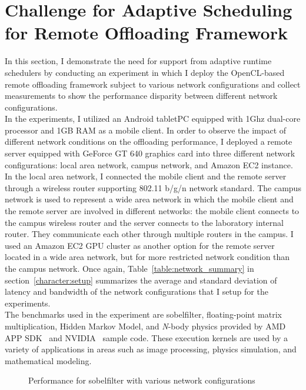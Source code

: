 \section{Challenge for Adaptive Scheduling for Remote Offloading
Framework}
\label{scheduler:challenge}
In this section, I demonstrate the need for support from adaptive
runtime schedulers by conducting an experiment in which I deploy the
OpenCL-based remote offloading framework subject to various network
configurations and collect measurements to show the performance
disparity between different network configurations.\\
%
In the experiments, I utilized an Android tabletPC equipped with
1Ghz dual-core processor and 1GB RAM as a mobile client.
%
In order to observe the impact of different network
conditions on the offloading performance, I deployed a remote server
equipped with GeForce GT 640 graphics card into three different network
configurations: local area network, campus network, and Amazon EC2
instance.
%
In the local area network, I connected the mobile client and the remote
server through a wireless router supporting 802.11 b/g/n network
standard.
%
The campus network is used to represent a wide area network in which
the mobile client and the remote server are involved in different
networks: the mobile client connects to the campus wireless router and
the server connects to the laboratory internal router.
%
They communicate each other through multiple routers in the campus.
%
I used an Amazon EC2 GPU cluster as another option for the remote
server located in a wide area network, but for more restricted network
condition than the campus network.
%
Once again, Table~\ref{table:network_summary} in
section~\ref{character:setup} summarizes the average and standard deviation of latency
and bandwidth of the network configurations that I setup for the
experiments.\\
%
The benchmarks used in the experiment are sobelfilter, floating-point
matrix multiplication, Hidden Markov Model, and \textit{N}-body physics
provided by AMD APP SDK~\cite{amd} and NVIDIA~\cite{nvidia} sample code.
%
These execution kernels are used by a variety of applications in areas such as image
processing, physics simulation, and mathematical modeling.\\
%
\begin{figure}
\centering
{}
\caption{Performance for sobelfilter with various network
configurations}
\label{fig:challenge_network}
\end{figure}
